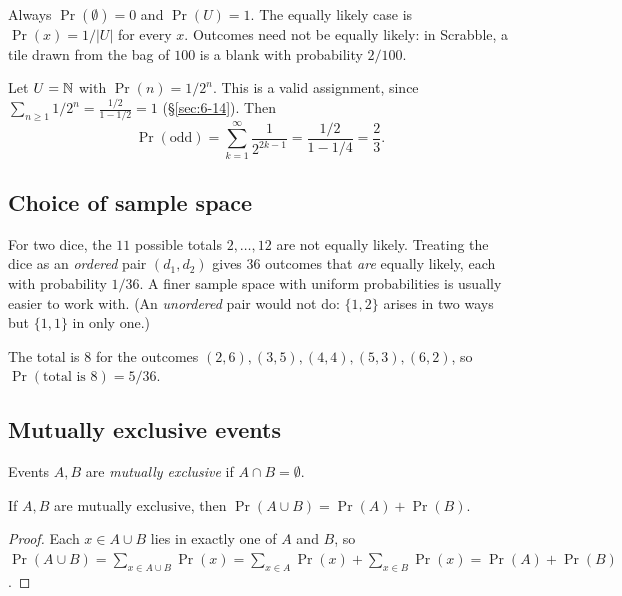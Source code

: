 \begin{note}
Always $\Pr(\emptyset)=0$ and $\Pr(U)=1$. The equally likely case is $\Pr(x)=1/|U|$ for every $x$. Outcomes need not be equally likely: in Scrabble, a tile drawn from the bag of $100$ is a blank with probability $2/100$.
\end{note}

\begin{example}
Let $U=\mathbb{N}$ with $\Pr(n)=1/2^n$. This is a valid assignment, since $\sum_{n\ge1}1/2^n=\frac{1/2}{1-1/2}=1$ (\S\ref{sec:6-14}). Then
\[
\Pr(\text{odd}) = \sum_{k=1}^\infty \frac{1}{2^{2k-1}} = \frac{1/2}{1-1/4} = \frac{2}{3}.
\]
\end{example}

\subsection{Choice of sample space}
\label{sec:9-3}

\begin{note}
For two dice, the $11$ possible totals $2,\dots,12$ are not equally likely. Treating the dice as an \emph{ordered} pair $(d_1,d_2)$ gives $36$ outcomes that \emph{are} equally likely, each with probability $1/36$. A finer sample space with uniform probabilities is usually easier to work with. (An \emph{unordered} pair would not do: $\{1,2\}$ arises in two ways but $\{1,1\}$ in only one.)
\end{note}

\begin{example}
The total is $8$ for the outcomes $(2,6),(3,5),(4,4),(5,3),(6,2)$, so $\Pr(\text{total is }8)=5/36$.
\end{example}

\subsection{Mutually exclusive events}
\label{sec:9-4}

\begin{definition}
Events $A,B$ are \emph{mutually exclusive} if $A\cap B=\emptyset$.
\end{definition}

\begin{proposition}
If $A,B$ are mutually exclusive, then $\Pr(A\cup B)=\Pr(A)+\Pr(B)$.
\end{proposition}
\begin{proof}
Each $x\in A\cup B$ lies in exactly one of $A$ and $B$, so $\Pr(A\cup B)=\sum_{x\in A\cup B}\Pr(x)=\sum_{x\in A}\Pr(x)+\sum_{x\in B}\Pr(x)=\Pr(A)+\Pr(B)$.
\end{proof}


